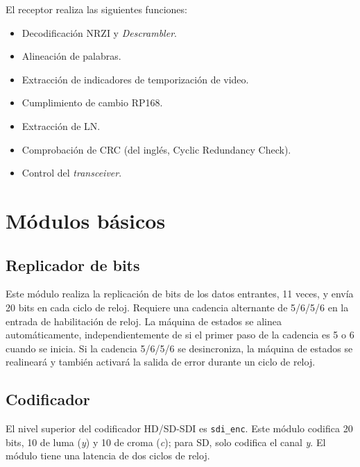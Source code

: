   El receptor realiza las siguientes funciones:
  \begin{itemize}
      \item Decodificación NRZI y \textit{Descrambler}.
      \item Alineación de palabras.
      \item Extracción de indicadores de temporización de video.
      \item Cumplimiento de cambio RP168.
      \item Extracción de LN\@.
      \item Comprobación de CRC  (del inglés, Cyclic Redundancy Check)\@.
      \item Control del \textit{transceiver}.
  \end{itemize}

\section{Módulos básicos}

\subsection{Replicador de bits}

  Este módulo realiza la replicación de bits de los datos entrantes, 11 veces,
  y envía 20 bits en cada ciclo de reloj. Requiere una cadencia
  alternante de 5/6/5/6 en la entrada de habilitación de reloj. La máquina
  de estados se alinea automáticamente, independientemente de si el primer
  paso de la cadencia es 5 o 6 cuando se inicia. Si la cadencia 5/6/5/6 se
  desincroniza, la máquina de estados se realineará y también activará la
  salida de error durante un ciclo de reloj.


\subsection{Codificador}

  El nivel superior del codificador HD/SD-SDI es \texttt{sdi\_enc}. Este módulo
  codifica 20 bits, 10 de luma (\textit{y}) y 10 de croma (\textit{c}); para SD,
  solo codifica el canal \textit{y}. El módulo tiene una latencia de dos ciclos
  de reloj.

